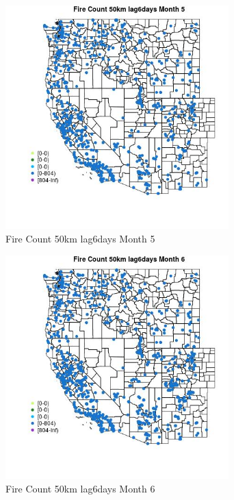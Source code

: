 \begin{figure} 
\centering  
\includegraphics[width=0.77\textwidth]{Code_Outputs/Report_ML_input_PM25_Step4_part_f_de_duplicated_aves_prioritize_24hr_obswNAs_MapObsMo5Fire_Count_50km_lag6days.jpg} 
\caption{\label{fig:Report_ML_input_PM25_Step4_part_f_de_duplicated_aves_prioritize_24hr_obswNAsMapObsMo5Fire_Count_50km_lag6days}Fire Count 50km lag6days Month 5} 
\end{figure} 
 

\begin{figure} 
\centering  
\includegraphics[width=0.77\textwidth]{Code_Outputs/Report_ML_input_PM25_Step4_part_f_de_duplicated_aves_prioritize_24hr_obswNAs_MapObsMo6Fire_Count_50km_lag6days.jpg} 
\caption{\label{fig:Report_ML_input_PM25_Step4_part_f_de_duplicated_aves_prioritize_24hr_obswNAsMapObsMo6Fire_Count_50km_lag6days}Fire Count 50km lag6days Month 6} 
\end{figure} 
 

